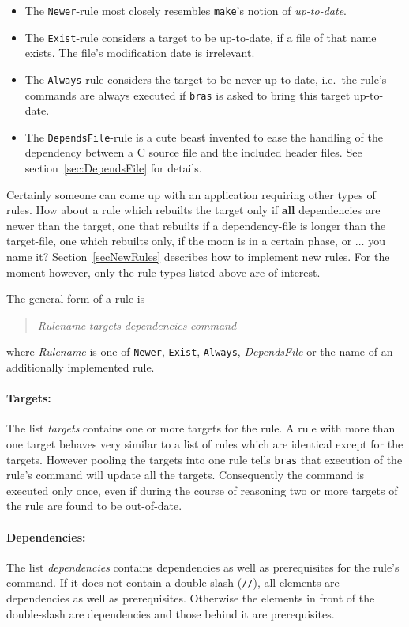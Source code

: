 \documentclass[12pt]{article}
\newcommand{\bras}{\texttt{bras}}
\newcommand{\make}{\texttt{make}}
\begin{document}
\begin{itemize}
\item 
The \texttt{Newer}-rule most closely resembles \make's notion of
\textit{up-to-date}.
\item 
The \texttt{Exist}-rule considers a target to be up-to-date,
if a file of that name exists. The file's modification date is irrelevant.
\item 
The \texttt{Always}-rule considers the target to be never
up-to-date, i.e.\ the rule's commands are always executed if
\bras{} is asked to bring this target up-to-date.
\item
The \texttt{DependsFile}-rule is a cute beast invented to ease the
handling of the dependency between a C source file and the included
header files. See section~\ref{sec:DependsFile} for details. 
\end{itemize}

Certainly someone can come up with an application requiring other
types of rules. How about a rule which rebuilts
the target only if \textbf{all} dependencies are newer than the
target, one that rebuilts if a dependency-file is longer than the
target-file, one which rebuilts only, if the moon is in a certain
phase, or $\ldots$ you name it?  Section~\ref{secNewRules} describes
how to implement new rules. For the moment however, only the
rule-types listed above are of interest.

The general form of a rule is
\begin{quote}
\textit{Rulename} \textit{targets} \textit{dependencies} \textit{command}
\end{quote}
where \textit{Rulename} is one of \texttt{Newer}, \texttt{Exist},
\texttt{Always}, \textit{DependsFile} or the name of an additionally
implemented rule. 

\paragraph{Targets:}
The list \textit{targets} contains one or more targets for the rule. A
rule with more than one target behaves very similar to a list of rules
which are identical except for the targets. However pooling the
targets into one rule tells \bras{} that execution of the rule's
command will update all the targets. Consequently the command
is executed only once, even if during the course of reasoning two or
more targets of the rule are found to be out-of-date.

\paragraph{Dependencies:}
The list \textit{dependencies} contains dependencies as well as
prerequisites for the rule's command. If it does not contain a
double-slash (\texttt{//}), all elements are dependencies as
well as prerequisites. Otherwise the elements in front of the
double-slash are dependencies and those behind it are prerequisites.
\end{document}
